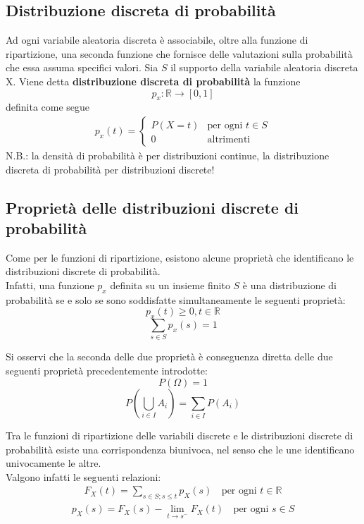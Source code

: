 \subsection{Distribuzione discreta di probabilità}
Ad ogni variabile aleatoria discreta è associabile, oltre alla funzione di ripartizione, una seconda funzione che fornisce delle valutazioni sulla probabilità che essa assuma specifici valori.
Sia $S$ il supporto della variabile aleatoria discreta X.
Viene detta \textbf{distribuzione discreta di probabilità} la funzione
\begin{equation}
	p_x : \mathbb{R} \rightarrow [0, 1]
\end{equation}
definita come segue
\begin{align}
	p_x(t) = 
	\begin{cases}
		P(X = t) & \text{per ogni $t \in S$} \\
		0  & \text{altrimenti}
	\end{cases}
\end{align}
N.B.: la densità di probabilità è per distribuzioni continue, la distribuzione discreta di probabilità per distribuzioni discrete!

\subsection{Proprietà delle distribuzioni discrete di probabilità}
Come per le funzioni di ripartizione, esistono alcune proprietà che identificano le distribuzioni discrete di probabilità. \\
Infatti, una funzione $p_x$ definita su un insieme finito $S$ è una distribuzione di probabilità se e solo se sono soddisfatte simultaneamente le seguenti proprietà:
\[
	p_x(t) \geq 0, t \in \mathbb{R}
\]
\[
	\sum_{s \in S} p_x(s) = 1
\]

Si osservi che la seconda delle due proprietà è conseguenza diretta delle due seguenti proprietà precedentemente introdotte:
\[
P(\Omega) = 1
\]
\[
	P(\bigcup_{i \in I} A_i) = \sum_{i \in I} P(A_i)
\]

Tra le funzioni di ripartizione delle variabili discrete e le distribuzioni discrete di probabilità esiste una corrispondenza biunivoca, nel senso che le une identificano univocamente le altre.
\\
Valgono infatti le seguenti relazioni:
\begin{align*}
	F_X (t) = \sum_{s \in S; s \leq t} p_X (s) & \, \text{per ogni } t \in \mathbb{R}
\end{align*}
\begin{align*}
	p_X (s) = F_X(s) - \lim_{t \to s^-} F_X(t) & \, \text{per ogni } s \in S
\end{align*}

